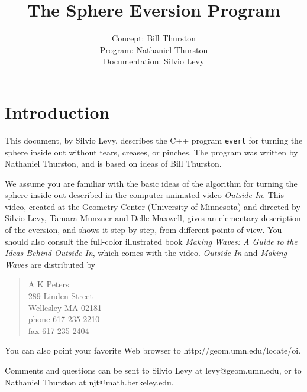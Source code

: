 
\addtolength{\textheight}{1in}
\addtolength{\topmargin}{-.5in}
\addtolength{\textwidth}{1in}
\addtolength{\oddsidemargin}{-.5in}
\addtolength{\evensidemargin}{-.5in}

\def\OI/{{\it Outside In}}
\def\MW/{{\it Making Waves}}
\def\Ev/{{\tt Evert}}
\def\ev/{{\tt evert}}

\title{The Sphere Eversion Program}
\author{Concept: Bill Thurston\\
Program: Nathaniel Thurston\\
Documentation: Silvio Levy}



\maketitle

\section*{Introduction}

This document, by Silvio Levy, describes the C++ program \ev/ for
turning the sphere inside out without tears, creases, or pinches.  The
program was written by Nathaniel Thurston, and is based on ideas of
Bill Thurston.

We assume you are familiar with the basic ideas of the algorithm for
turning the sphere inside out described in the computer-animated video
\OI/.  This video, created at the Geometry Center (University of
Minnesota) and directed by Silvio Levy, Tamara Munzner and Delle
Maxwell, gives an elementary description of the eversion, and shows it
step by step, from different points of view.  You should also consult
the full-color illustrated book {\it Making Waves: A Guide to the
Ideas Behind \OI/}, which comes with the video.  \OI/ and \MW/ are
distributed by
%
\begin{verse}
A K Peters\\
289 Linden Street\\
Wellesley MA 02181\\
phone 617-235-2210\\
fax 617-235-2404\par
\end{verse}
%
You can also point your favorite Web browser to
http:/$\!$/geom.umn.edu/locate/oi.

Comments and questions can be sent to Silvio Levy at
levy@geom.umn.edu, or to Nathaniel Thurston at njt@math.berkeley.edu.


